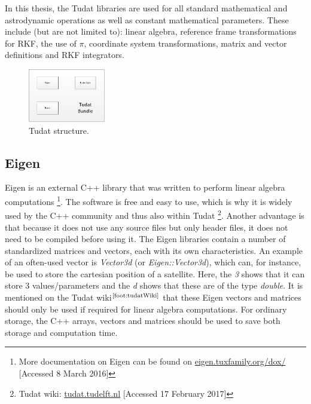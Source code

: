 In this thesis, the \ac{Tudat} libraries are used for all standard mathematical and astrodynamic operations as well as constant mathematical parameters. These include (but are not limited to): linear algebra, reference frame transformations for \ac{RKF}, the use of $\pi$, coordinate system transformations, matrix and vector definitions and \ac{RKF} integrators.

\begin{figure}[H]
\centering
\includegraphics[width=0.3\textwidth]{figures/software/tudatBlock.png}
\caption{\ac{Tudat} structure.}
\label{fig:tudatBlock}
\end{figure}

\subsection{Eigen}
\label{subsec:eigen}
Eigen is an external C++ library that was written to perform linear algebra computations \footnote{More documentation on Eigen can be found on \url{eigen.tuxfamily.org/dox/} [Accessed 8 March 2016] }. The software is free and easy to use, which is why it is widely used by the C++ community and thus also within \ac{Tudat} \footnote{\label{foot:tudatWiki} Tudat wiki: \url{tudat.tudelft.nl} [Accessed 17 February 2017] }. Another advantage is that because it does not use any source files but only header files, it does not need to be compiled before using it. 
The Eigen libraries contain a number of standardized matrices and vectors, each with its own characteristics. An example of an often-used vector is \textit{Vector3d} (or \textit{Eigen::Vector3d}), which can, for instance, be used to store the cartesian position of a satellite. Here, the \textit{3} shows that it can store 3 values/parameters and the \textit{d} shows that these are of the type \textit{double}. It is mentioned on the \ac{Tudat} wiki$^{\text{\ref{foot:tudatWiki}}}$ that these Eigen vectors and matrices should only be used if required for linear algebra computations. For ordinary storage, the C++ arrays, vectors and matrices should be used to save both storage and computation time.


